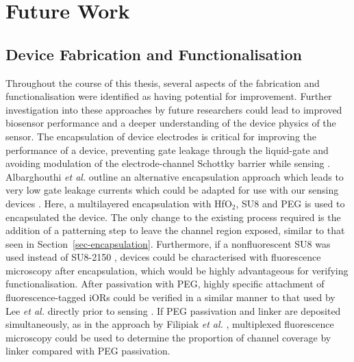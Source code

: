 \documentclass[
  a4paper,
]{scrbook}
\begin{document}
\hypertarget{sec-future-work}{%
\section{Future Work}\label{sec-future-work}}

\hypertarget{sec-future-work-fabrication}{%
\subsection{Device Fabrication and
Functionalisation}\label{sec-future-work-fabrication}}

Throughout the course of this thesis, several aspects of the fabrication
and functionalisation were identified as having potential for
improvement. Further investigation into these approaches by future
researchers could lead to improved biosensor performance and a deeper
understanding of the device physics of the sensor. The encapsulation of
device electrodes is critical for improving the performance of a device,
preventing gate leakage through the liquid-gate and avoiding modulation
of the electrode-channel Schottky barrier while sensing
\autocite{Lim2014,Albarghouthi2022,Heller2008}. Albarghouthi \emph{et
al.} outline an alternative encapsulation approach which leads to very
low gate leakage currents which could be adapted for use with our
sensing devices \autocite{Albarghouthi2022}. Here, a multilayered
encapsulation with HfO\(_2\), SU8 and PEG is used to encapsulated the
device. The only change to the existing process required is the addition
of a patterning step to leave the channel region exposed, similar to
that seen in Section~\ref{sec-encapsulation}. Furthermore, if a
nonfluorescent SU8 was used instead of SU8-2150 \autocite{Vobornik2023},
devices could be characterised with fluorescence microscopy after
encapsulation, which would be highly advantageous for verifying
functionalisation. After passivation with PEG, highly specific
attachment of fluorescence-tagged iORs could be verified in a similar
manner to that used by Lee \emph{et al.} directly prior to sensing
\autocite{Lee2012b}. If PEG passivation and linker are deposited
simultaneously, as in the approach by Filipiak \emph{et al.}
\autocite{Filipiak2018}, multiplexed fluorescence microscopy could be
used to determine the proportion of channel coverage by linker compared
with PEG passivation.
\end{document}

